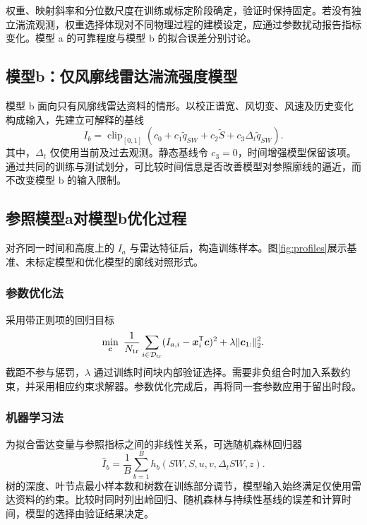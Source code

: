 权重、映射斜率和分位数尺度在训练或标定阶段确定，验证时保持固定。若没有独立湍流观测，权重选择体现对不同物理过程的建模设定，应通过参数扰动报告指标变化。模型 a 的可靠程度与模型 b 的拟合误差分别讨论。
\subsection{模型b：仅风廓线雷达湍流强度模型}
模型 b 面向只有风廓线雷达资料的情形。以校正谱宽、风切变、风速及历史变化构成输入，先建立可解释的基线
\begin{equation}
I_b=\operatorname{clip}_{[0,1]}\left(c_0+c_1\widetilde q_{SW}+c_2\widetilde S+c_3\Delta_t\widetilde q_{SW}\right).
\end{equation}
其中，$\Delta_t$ 仅使用当前及过去观测。静态基线令 $c_3=0$，时间增强模型保留该项。通过共同的训练与测试划分，可比较时间信息是否改善模型对参照廓线的逼近，而不改变模型 b 的输入限制。
\subsection{参照模型a对模型b优化过程}
对齐同一时间和高度上的 $I_a$ 与雷达特征后，构造训练样本。图\ref{fig:profiles}展示基准、未标定模型和优化模型的廓线对照形式。
\subsubsection{参数优化法}
采用带正则项的回归目标
\begin{equation}
\min_{\bm c}\ \frac1{N_{\rm tr}}\sum_{i\in\mathcal D_{\rm tr}}
(I_{a,i}-\bm x_i^\mathsf T\bm c)^2+\lambda\|\bm c_{1:}\|_2^2.
\end{equation}
截距不参与惩罚，$\lambda$ 通过训练时间块内部验证选择。需要非负组合时加入系数约束，并采用相应约束求解器。参数优化完成后，再将同一套参数应用于留出时段。
\subsubsection{机器学习法}
为拟合雷达变量与参照指标之间的非线性关系，可选随机森林回归器
\begin{equation}
\widehat I_b=\frac1B\sum_{b=1}^{B}h_b(SW,S,u,v,\Delta_tSW,z).
\end{equation}
树的深度、叶节点最小样本数和树数在训练部分调节，模型输入始终满足仅使用雷达资料的约束。比较时同时列出岭回归、随机森林与持续性基线的误差和计算时间，模型的选择由验证结果决定。
